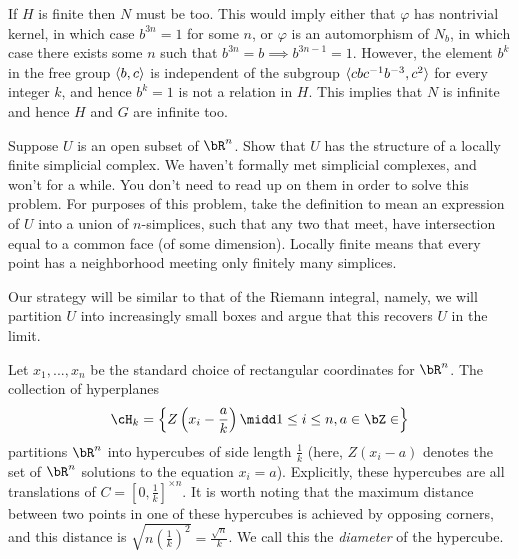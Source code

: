 \begin{homework}[e]
\begin{prf}
		If $H$ is finite then $N$ must be too. This would imply either that $\varphi$ has nontrivial kernel, in which case $b^{3n} = 1$ for some $n$, or $\varphi$ is an automorphism of $N_b$, in which case there exists some $n$ such that $b^{3n} = b \implies b^{3n - 1} = 1$. However, the element $b^k$ in the free group $\langle b,c\rangle$ is independent of the subgroup $\langle cbc^{-1}b^{-3}, c^2\rangle$ for every integer $k$, and hence $b^k = 1$ is not a relation in $H$. This implies that $N$ is infinite and hence $H$ and $G$ are infinite too.
	\end{prf}

	
	\prob Suppose $U$ is an open subset of $\bR^n$.  Show that $U$ has the structure of a locally finite simplicial complex.  We haven't formally met simplicial complexes, and won't for a while.  You don't need to read up on them in order to solve this problem. For purposes of this problem, take the definition to mean an expression of $U$ into a union of $n$-simplices, such that any two that meet, have intersection equal to a common face (of some dimension).  Locally finite means that every point has a neighborhood meeting only finitely many simplices.
	\begin{prf}
		Our strategy will be similar to that of the Riemann integral, namely, we will partition $U$ into increasingly small boxes and argue that this recovers $U$ in the limit.

		Let $x_1,...,x_n$ be the standard choice of rectangular coordinates for $\bR^n$. The collection of hyperplanes
		\begin{align*}
			\cH_k = \left\{Z\left(x_i-\frac{a}{k}\right) \midd 1\leq i\leq n, a \in \bZ \in \right\} 
		\end{align*}
		partitions $\bR^n$ into hypercubes of side length $\frac{1}{k}$ (here, $Z(x_i - a)$ denotes the set of $\bR^n$ solutions to the equation $x_i = a$). Explicitly, these hypercubes are all translations of $C = \left[0,\frac{1}{k}\right]^{\times n}$. It is worth noting that the maximum distance between two points in one of these hypercubes is achieved by opposing corners, and this distance is $\sqrt{n\left(\frac{1}{k}\right)^2} = \frac{\sqrt{n}}{k}$. We call this the \emph{diameter} of the hypercube.

		\bigskip


\end{prf}
\end{homework}
